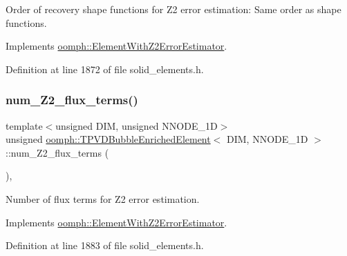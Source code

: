 Order of recovery shape functions for Z2 error estimation\+: Same order as shape functions. 



Implements \hyperlink{classoomph_1_1ElementWithZ2ErrorEstimator_af39480835bd3e0f6b2f4f7a9a4044798}{oomph\+::\+Element\+With\+Z2\+Error\+Estimator}.



Definition at line 1872 of file solid\+\_\+elements.\+h.

\mbox{\label{classoomph_1_1TPVDBubbleEnrichedElement_a5ac20ef9354f134de8b1ec8be4b0f6c4}} 
\subsubsection{\texorpdfstring{num\+\_\+\+Z2\+\_\+flux\+\_\+terms()}{num\_Z2\_flux\_terms()}}
{\footnotesize\ttfamily template$<$unsigned D\+IM, unsigned N\+N\+O\+D\+E\+\_\+1D$>$ \\
unsigned \hyperlink{classoomph_1_1TPVDBubbleEnrichedElement}{oomph\+::\+T\+P\+V\+D\+Bubble\+Enriched\+Element}$<$ D\+IM, N\+N\+O\+D\+E\+\_\+1D $>$\+::num\+\_\+\+Z2\+\_\+flux\+\_\+terms (\begin{DoxyParamCaption}{ }\end{DoxyParamCaption})\hspace{0.3cm}{\ttfamily [inline]}, {\ttfamily [virtual]}}



Number of \textquotesingle{}flux\textquotesingle{} terms for Z2 error estimation. 



Implements \hyperlink{classoomph_1_1ElementWithZ2ErrorEstimator_ae82c5728902e13da31be19c390fc28e3}{oomph\+::\+Element\+With\+Z2\+Error\+Estimator}.



Definition at line 1883 of file solid\+\_\+elements.\+h.

\mbox{\label{classoomph_1_1TPVDBubbleEnrichedElement_ab8cb112f848a59cd54f14e72143927eb}} 
